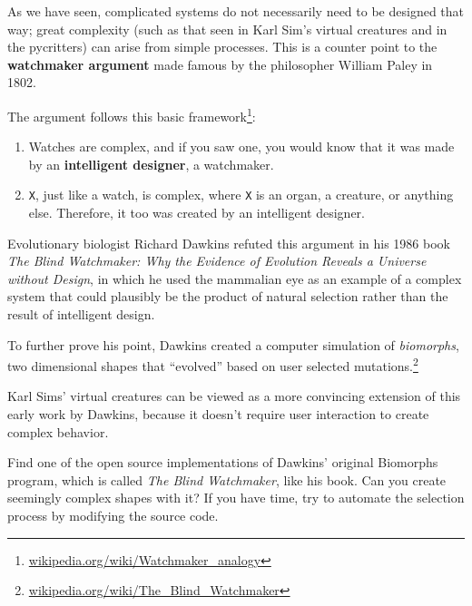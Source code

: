 \documentclass[10pt]{book}
\begin{document}
As we have seen, complicated systems do not necessarily need to be designed that
way; great complexity (such as that seen in Karl Sim's virtual creatures and in the pycritters) 
can arise from simple processes. This is a counter point to the {\bf watchmaker
argument} made famous by the philosopher William Paley in 1802. 

The argument follows this basic
framework\footnote{\url{wikipedia.org/wiki/Watchmaker_analogy}}:

\begin{enumerate}
  \item Watches are complex, and if you saw one, you would know that it was made
  by an {\bf intelligent designer}, a watchmaker.

  \item {\tt X}, just like a watch, is complex, where {\tt X} is an organ, a
  creature, or anything else. Therefore, it too was created by
  an intelligent designer.
\end{enumerate}

Evolutionary biologist Richard Dawkins refuted this argument in his 1986 book
{\em The Blind Watchmaker: Why the Evidence of Evolution Reveals a Universe
without Design}, in which he used the mammalian eye as an example of a complex
system that could plausibly be the product of natural selection rather than the
result of intelligent design.

To further prove his point, Dawkins created a computer simulation of {\em
biomorphs}, two dimensional shapes that ``evolved'' based on user selected
mutations.\footnote{\url{wikipedia.org/wiki/The_Blind_Watchmaker}}

Karl Sims' virtual creatures can be viewed as a more convincing extension of this early work by
Dawkins, because it doesn't require user interaction to create complex behavior.

\begin{ex} %
  Find one of the open source implementations of Dawkins' original Biomorphs
  program, which is called {\em The Blind Watchmaker}, like his book. Can you create 
  seemingly complex shapes with it? If you have time, try to automate the selection process
  by modifying the source code. 
\end{ex}

\printindex

\clearemptydoublepage

\end{document}
